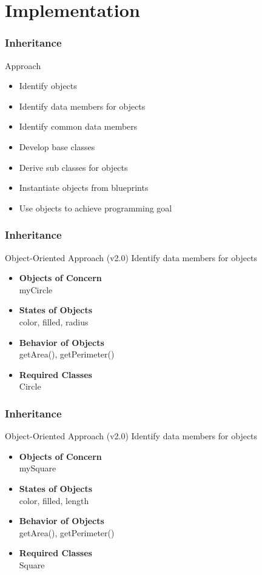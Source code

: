 \documentclass[10pt, compress]{beamer}
\begin{document}
\section{Implementation}

\begin{frame}[fragile]
  \frametitle{Inheritance}
  \begin{block}{Approach}
    \begin{itemize}
      \item[] Identify objects
      \item[] Identify data members for objects
      \item[] Identify common data members
      \item[] Develop base classes
      \item[] Derive sub classes for objects
      \item[] Instantiate objects from blueprints
      \item[] Use objects to achieve programming goal
    \end{itemize}
  \end{block}
\end{frame}

\begin{frame}[fragile]
  \frametitle{Inheritance}
  \begin{block}{Object-Oriented Approach (v2.0)}
  Identify data members for objects
    \begin{itemize}
      \item[] \textbf{Objects of Concern}\\myCircle
      \item[] \textbf{States of Objects}\\color, filled, radius
      \item[] \textbf{Behavior of Objects}\\getArea(), getPerimeter()
      \item[] \textbf{Required Classes}\\Circle
    \end{itemize}
  \end{block}
\end{frame}

\begin{frame}[fragile]
  \frametitle{Inheritance}
  \begin{block}{Object-Oriented Approach (v2.0)}
  Identify data members for objects
    \begin{itemize}
      \item[] \textbf{Objects of Concern}\\mySquare
      \item[] \textbf{States of Objects}\\color, filled, length
      \item[] \textbf{Behavior of Objects}\\getArea(), getPerimeter()
      \item[] \textbf{Required Classes}\\Square
    \end{itemize}
  \end{block}
\end{frame}
\end{document}
